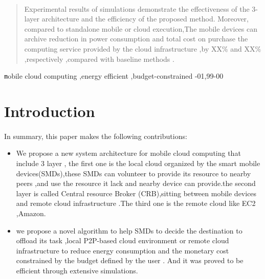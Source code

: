 \documentclass[review]{elsarticle}
\begin{document}
\begin{frontmatter}
\begin{abstract}
   \paragraph{} Experimental results of simulations demonstrate the effectiveness of the 3-layer architecture and the efficiency of the proposed method. Moreover, compared to standalone mobile or cloud execution,The mobile devices can archive reduction in power consumption and total cost on purchase the computing service provided by the cloud infrastructure ,by XX\% and XX\% ,respectively ,compared with baseline methods .
\end{abstract}

\begin{keyword}
    \texttt mobile cloud computing \sep  {energy efficient} \sep {budget-constrained}
    -01\sep  99-00
\end{keyword}

\end{frontmatter}


\section{Introduction}

\paragraph{} %
In summary, this paper makes the following contributions:
\begin{itemize}
    \item We propose a new system architecture for mobile cloud computing that include 3 layer , the first one is the local cloud organized by the smart  mobile devices(SMDs),these SMDs can volunteer to provide its resource to nearby peers ,and use the resource it lack and nearby device can provide.the second layer is called Central resource Broker (CRB),sitting between mobile devices and remote cloud infrastructure .The third one is the remote cloud like EC2 ,Amazon.
    
    \item  we propose a novel algorithm to help SMDs to decide the destination to offload its task ,local P2P-based cloud environment or remote cloud infrastructure to reduce energy consumption and the monetary cost constrained by the budget defined by the user . And it was proved to be efficient  through extensive simulations.
\end{itemize}
 
\end{document}

